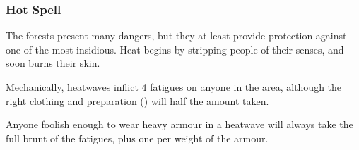 \begin{multicols}{2}
\subsubsection{Hot Spell}

The forests present many dangers, but they at least provide protection against one of the most insidious.
Heat begins by stripping people of their senses, and soon burns their skin.

Mechanically, heatwaves inflict 4 \glspl{fatigue} on anyone in the area, although the right clothing and preparation () will half the amount taken.

Anyone foolish enough to wear heavy armour in a heatwave will always take the full brunt of the \glspl{fatigue}, plus one per \gls{weight} of the armour.

\end{multicols}

\bigLine

